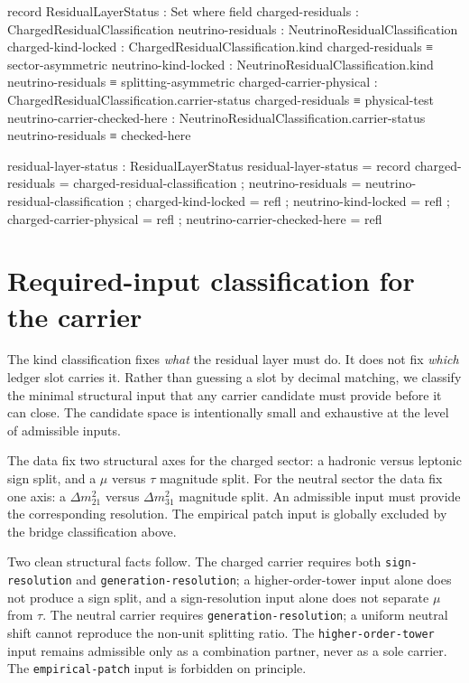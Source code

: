 \documentclass[11pt]{article}
\begin{document}
\begin{code}
record ResidualLayerStatus : Set where
  field
    charged-residuals             : ChargedResidualClassification
    neutrino-residuals            : NeutrinoResidualClassification
    charged-kind-locked           :
      ChargedResidualClassification.kind charged-residuals
        ≡ sector-asymmetric
    neutrino-kind-locked          :
      NeutrinoResidualClassification.kind neutrino-residuals
        ≡ splitting-asymmetric
    charged-carrier-physical      :
      ChargedResidualClassification.carrier-status charged-residuals
        ≡ physical-test
    neutrino-carrier-checked-here :
      NeutrinoResidualClassification.carrier-status neutrino-residuals
        ≡ checked-here

residual-layer-status : ResidualLayerStatus
residual-layer-status = record
  { charged-residuals      = charged-residual-classification
  ; neutrino-residuals     = neutrino-residual-classification
  ; charged-kind-locked    = refl
  ; neutrino-kind-locked   = refl
  ; charged-carrier-physical = refl
  ; neutrino-carrier-checked-here = refl
  }
\end{code}

\section{Required-input classification for the carrier}

The kind classification fixes \emph{what} the residual layer must do.
It does not fix \emph{which} ledger slot carries it.  Rather than
guessing a slot by decimal matching, we classify the minimal structural
input that any carrier candidate must provide before it can close.  The
candidate space is intentionally small and exhaustive at the level of
admissible inputs.

The data fix two structural axes for the charged sector: a hadronic
versus leptonic sign split, and a $\mu$ versus $\tau$ magnitude split.
For the neutral sector the data fix one axis: a $\Delta m^2_{21}$
versus $\Delta m^2_{31}$ magnitude split.  An admissible input must
provide the corresponding resolution.  The empirical patch input is
globally excluded by the bridge classification above.

Two clean structural facts follow.  The charged carrier requires both
\texttt{sign-resolution} and \texttt{generation-resolution}; a
higher-order-tower input alone does not produce a sign split, and a
sign-resolution input alone does not separate $\mu$ from $\tau$.  The
neutral carrier requires \texttt{generation-resolution}; a uniform
neutral shift cannot reproduce the non-unit splitting ratio.  The
\texttt{higher-order-tower} input remains admissible only as a
combination partner, never as a sole carrier.  The
\texttt{empirical-patch} input is forbidden on principle.
\end{document}

